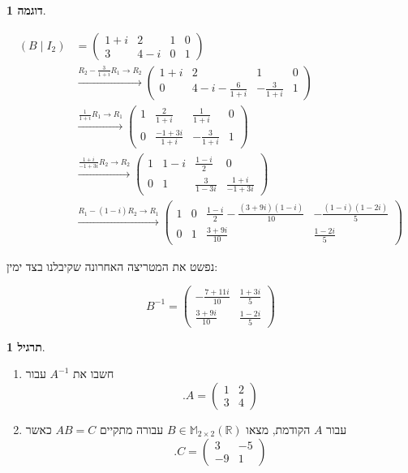 \documentclass[12pt]{report}
\theoremstyle{plain}
\theoremstyle{definition}
\newtheorem{example}{דוגמה}[chapter]
\newtheorem{exercise}{תרגיל}[chapter]
\newcommand{\R}{\mathbb{R}}
\newcommand{\M}{\mathbb{M}}
\newcommand{\0}{\mathbf{0}}
\begin{document}
\begin{example}
\begin{enumerate}[label=\alph*.]
$$
\begin{aligned}
(B\mid I_2)
&=\left(
\begin{array}{cc|cc}
1+i & 2 & 1 & 0 \\
3 & 4-i & 0 & 1
\end{array}
\right)
\\[4pt]
&\xrightarrow{R_2-\tfrac{3}{1+i}R_1\to R_2}
\left(
\begin{array}{cc|cc}
1+i & 2 & 1 & 0\\
0 & 4-i - \tfrac{6}{1+i} & -\tfrac{3}{1+i} & 1
\end{array}
\right)
\\[4pt]
&\xrightarrow{\tfrac{1}{1+i}R_1\to R_1}
\left(
\begin{array}{cc|cc}
1 & \tfrac{2}{1+i} & \tfrac{1}{1+i} & 0\\
0 & \tfrac{-1+3i}{1+i} & -\tfrac{3}{1+i} & 1
\end{array}
\right)
\\[4pt]
&\xrightarrow{\tfrac{1+i}{-1+3i}R_2\to R_2}
\left(
\begin{array}{cc|cc}
1 & 1-i & \tfrac{1-i}{2} & 0\\
0 & 1 & \tfrac{3}{1-3i} & \tfrac{1+i}{-1+3i}
\end{array}
\right)
\\[4pt]
&\xrightarrow{R_1-(1-i)R_2\to R_1}
\left(
\begin{array}{cc|cc}
1 & 0 & \tfrac{1-i}{2}-\tfrac{(3+9i)(1-i)}{10} & -\tfrac{(1-i)(1-2i)}{5} \\
0 & 1 & \tfrac{3+9i}{10} & \tfrac{1-2i}{5}
\end{array}
\right)
\end{aligned}
$$

נפשט את המטריצה האחרונה שקיבלנו בצד ימין:

$$
B^{-1}=\begin{pmatrix}
-\tfrac{7+11i}{10} & \tfrac{1+3i}{5} \\
\tfrac{3+9i}{10} & \tfrac{1-2i}{5}
\end{pmatrix}
$$


\end{enumerate}
\end{example}

\begin{exercise}\
\begin{enumerate}[label=\alph*.]
\item
חשבו את
$A^{-1}$
עבור
$$
.A=\begin{pmatrix}
1 & 2 \\
3 & 4
\end{pmatrix}
$$

\item 
עבור
$A$
הקודמת, מצאו
$B\in\M_{2\times 2}(\R)$
עבורה מתקיים
$
AB=C
$
כאשר
$$
.C=\begin{pmatrix}
3 & -5 \\
-9 & 1
\end{pmatrix}
$$


\end{enumerate}
\end{exercise}
\end{document}
